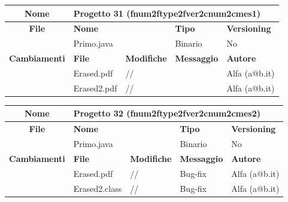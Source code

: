 \begin{table}[ht]
\footnotesize
\begin{tabular}{|c|p{2.5cm}|p{2cm}|p{2.5cm}|p{2.5cm}|}
  \hline
  \textbf{Nome}	& \multicolumn{4}{l|}{Progetto 31 (fnum2ftype2fver2cnum2cmes1)} 									\\
  \hline
  \rowcolor{lightgray}\textbf{File} 		& \multicolumn{2}{l|}{\textbf{Nome}}		& \textbf{Tipo}		& \textbf{Versioning} 		\\
						\cline{2-5}
						& \multicolumn{2}{l|}{Primo.java}		& Binario		& No				\\
  \hline
  \rowcolor{lightgray}\textbf{Cambiamenti}	& \textbf{File}		&\textbf{Modifiche}	& \textbf{Messaggio}	& \textbf{Autore}		\\
						\cline{2-5}
						& Erased.pdf		& //	 		& 			& Alfa (a@b.it)			\\
						\cline{2-5}
						& Erased2.pdf		& //	 		& 			& Alfa (a@b.it)			\\
						
  \hline
\end{tabular}
\end{table}

\begin{table}[ht]
\footnotesize
\begin{tabular}{|c|p{2.5cm}|p{2cm}|p{2.5cm}|p{2.5cm}|}
  \hline
  \textbf{Nome}	& \multicolumn{4}{l|}{Progetto 32 (fnum2ftype2fver2cnum2cmes2)} 									\\
  \hline
  \rowcolor{lightgray}\textbf{File} 		& \multicolumn{2}{l|}{\textbf{Nome}}		& \textbf{Tipo}		& \textbf{Versioning} 		\\
						\cline{2-5}
						& \multicolumn{2}{l|}{Primo.java}		& Binario		& No				\\
  \hline
  \rowcolor{lightgray}\textbf{Cambiamenti}	& \textbf{File}		&\textbf{Modifiche}	& \textbf{Messaggio}	& \textbf{Autore}		\\
						\cline{2-5}
						& Erased.pdf		& //	 		& Bug-fix		& Alfa (a@b.it)			\\
						\cline{2-5}
						& Erased2.class		& //	 		& Bug-fix		& Alfa (a@b.it)			\\
						
  \hline
\end{tabular}
\end{table}